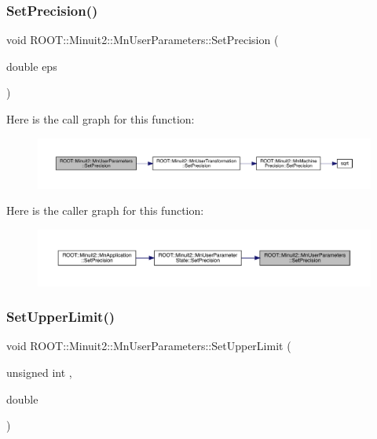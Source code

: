 \subsubsection{\texorpdfstring{SetPrecision()}{SetPrecision()}\hspace{0.1cm}{\footnotesize\ttfamily [2/2]}}
{\footnotesize\ttfamily void R\+O\+O\+T\+::\+Minuit2\+::\+Mn\+User\+Parameters\+::\+Set\+Precision (\begin{DoxyParamCaption}\item[{double}]{eps }\end{DoxyParamCaption})\hspace{0.3cm}{\ttfamily [inline]}}

Here is the call graph for this function\+:
\nopagebreak
\begin{figure}[H]
\begin{center}
\leavevmode
\includegraphics[width=350pt]{d6/d10/classROOT_1_1Minuit2_1_1MnUserParameters_aceaa10ac8b2c83261c3cc026705ee6e0_cgraph}
\end{center}
\end{figure}
Here is the caller graph for this function\+:\nopagebreak
\begin{figure}[H]
\begin{center}
\leavevmode
\includegraphics[width=350pt]{d6/d10/classROOT_1_1Minuit2_1_1MnUserParameters_aceaa10ac8b2c83261c3cc026705ee6e0_icgraph}
\end{center}
\end{figure}
\mbox{\label{classROOT_1_1Minuit2_1_1MnUserParameters_a9127811ac07731aea64f1869a620d11b}} 
\subsubsection{\texorpdfstring{SetUpperLimit()}{SetUpperLimit()}\hspace{0.1cm}{\footnotesize\ttfamily [1/4]}}
{\footnotesize\ttfamily void R\+O\+O\+T\+::\+Minuit2\+::\+Mn\+User\+Parameters\+::\+Set\+Upper\+Limit (\begin{DoxyParamCaption}\item[{unsigned int}]{,  }\item[{double}]{ }\end{DoxyParamCaption})}

